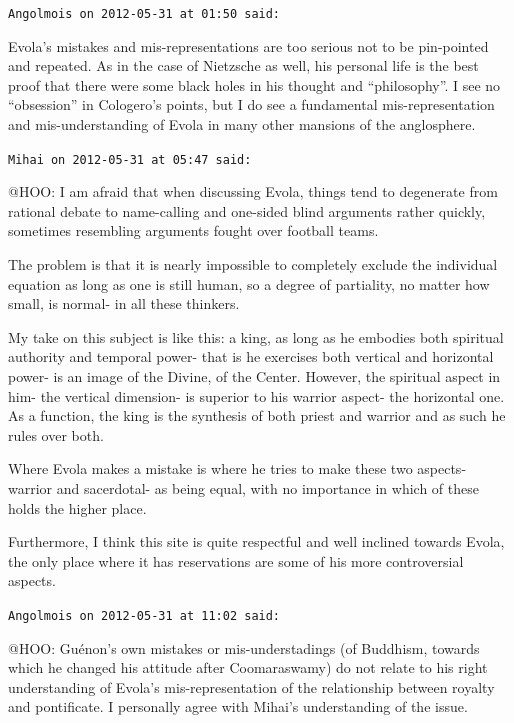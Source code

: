 \begin{footnotesize}
\begin{sffamily}

\texttt{Angolmois on 2012-05-31 at 01:50 said:}

Evola's mistakes and mis-representations are too serious not to be pin-pointed and repeated. As in the case of Nietzsche as well, his personal life is the best proof that there were some black holes in his thought and ``philosophy''. I see no ``obsession'' in Cologero's points, but I do see a fundamental mis-representation and mis-understanding of Evola in many other mansions of the anglosphere.

\hfill

\texttt{Mihai on 2012-05-31 at 05:47 said:}

@HOO: I am afraid that when discussing Evola, things tend to degenerate from rational debate to name-calling and one-sided blind arguments rather quickly, sometimes resembling arguments fought over football teams.

The problem is that it is nearly impossible to completely exclude the individual equation as long as one is still human, so a degree of partiality, no matter how small, is normal- in all these thinkers.

My take on this subject is like this: a king, as long as he embodies both spiritual authority and temporal power- that is he exercises both vertical and horizontal power- is an image of the Divine, of the Center. However, the spiritual aspect in him- the vertical dimension- is superior to his warrior aspect- the horizontal one. As a function, the king is the synthesis of both priest and warrior and as such he rules over both.

Where Evola makes a mistake is where he tries to make these two aspects- warrior and sacerdotal- as being equal, with no importance in which of these holds the higher place.

Furthermore, I think this site is quite respectful and well inclined towards Evola, the only place where it has reservations are some of his more controversial aspects.

\hfill

\texttt{Angolmois on 2012-05-31 at 11:02 said:}

@HOO: Guénon's own mistakes or mis-understadings (of Buddhism, towards which he changed his attitude after Coomaraswamy) do not relate to his right understanding of Evola's mis-representation of the relationship between royalty and pontificate. I personally agree with Mihai's understanding of the issue.


\end{sffamily}
\end{footnotesize}
